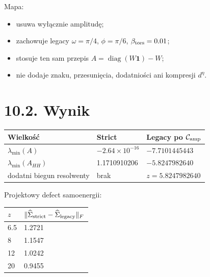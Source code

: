 \documentclass[11pt,a4paper,openany]{report}
\begin{document}
Mapa:

\begin{itemize}
\item 
usuwa wyłącznie amplitudę;

\item 
zachowuje legacy \(\omega=\pi/4\), \(\phi=\pi/6\), \(\beta_{\rm tors}=0.01\);

\item 
stosuje ten sam przepis \(A=\operatorname{diag}(W\mathbf1)-W\);

\item 
nie dodaje znaku, przesunięcia, dodatniości ani kompresji \(d^\eta\).

\end{itemize}

\section{10.2. Wynik}

\begin{center}
\begingroup\small
\setlength{\tabcolsep}{2.5pt}
\renewcommand{\arraystretch}{1.16}
\begin{longtable}{@{}p{}p{}p{}@{}}
\toprule
\textbf{Wielkość} & \textbf{Strict} & \textbf{Legacy po \(\mathcal C_{\rm amp}\)} \\
\midrule
\endhead
\(\lambda_{\min}(A)\) & \(-2.64\times10^{-16}\) & \(-7.7101445443\) \\
\(\lambda_{\min}(A_{HH})\) & 1.1710910206 & \(-5.8247982640\) \\
dodatni biegun resolwenty & brak & \(z=5.8247982640\) \\
\bottomrule
\end{longtable}
\endgroup
\end{center}

Projektowy defect samoenergii:

\begin{center}
\begingroup\small
\setlength{\tabcolsep}{2.5pt}
\renewcommand{\arraystretch}{1.16}
\begin{longtable}{@{}p{}p{}@{}}
\toprule
\textbf{\(z\)} & \textbf{\(\|\widehat\Sigma_{\rm strict}-\widehat\Sigma_{\rm legacy}\|_F\)} \\
\midrule
\endhead
6.5 & 1.2721 \\
8 & 1.1547 \\
12 & 1.0242 \\
20 & 0.9455 \\
\bottomrule
\end{longtable}
\endgroup
\end{center}
\end{document}
